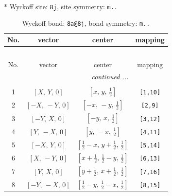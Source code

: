 \documentclass[fleqn,8pt]{jsarticle}
\begin{document}
* Wyckoff site: {\tt 8j}, site symmetry: {\tt m..}
\renewcommand{\arraystretch}{1.2}
\begin{longtable}{cccc}
\caption{Wyckoff bond: {\tt 8a@8j}, bond symmetry: {\tt m..}}
 \\
 \hline \hline
No. & vector & center & mapping \\ \hline \endfirsthead

\multicolumn{3}{l}{\tablename\ \thetable{}} \\
 \hline \hline
No. & vector & center & mapping \\ \hline \endhead

 \hline \hline
\multicolumn{3}{r}{\footnotesize\it continued ...} \\ \endfoot

 \hline \hline
\multicolumn{3}{r}{} \\ \endlastfoot

1 & $\left[ X,\, Y,\, 0 \right]$ & $\left[ x,\, y,\, \frac{1}{2} \right]$ & {\tt [1,10]} \\ \hline
2 & $\left[ - X,\, - Y,\, 0 \right]$ & $\left[ - x,\, - y,\, \frac{1}{2} \right]$ & {\tt [2,9]} \\ \hline
3 & $\left[ - Y,\, X,\, 0 \right]$ & $\left[ - y,\, x,\, \frac{1}{2} \right]$ & {\tt [3,12]} \\ \hline
4 & $\left[ Y,\, - X,\, 0 \right]$ & $\left[ y,\, - x,\, \frac{1}{2} \right]$ & {\tt [4,11]} \\ \hline
5 & $\left[ - X,\, Y,\, 0 \right]$ & $\left[ \frac{1}{2} - x,\, y + \frac{1}{2},\, \frac{1}{2} \right]$ & {\tt [5,14]} \\ \hline
6 & $\left[ X,\, - Y,\, 0 \right]$ & $\left[ x + \frac{1}{2},\, \frac{1}{2} - y,\, \frac{1}{2} \right]$ & {\tt [6,13]} \\ \hline
7 & $\left[ Y,\, X,\, 0 \right]$ & $\left[ y + \frac{1}{2},\, x + \frac{1}{2},\, \frac{1}{2} \right]$ & {\tt [7,16]} \\ \hline
8 & $\left[ - Y,\, - X,\, 0 \right]$ & $\left[ \frac{1}{2} - y,\, \frac{1}{2} - x,\, \frac{1}{2} \right]$ & {\tt [8,15]} \\
\end{longtable}
\renewcommand{\arraystretch}{1.2}
\end{document}
